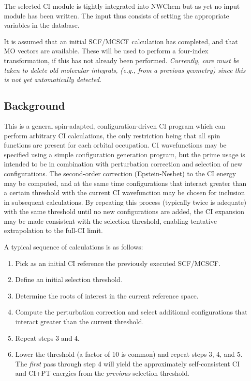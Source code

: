 \label{sec:selci}
The selected CI module is tightly integrated into NWChem but as yet no
input module has been written.  The input thus consists of setting the
appropriate variables in the database.

It is assumed that an initial SCF/MCSCF calculation has completed, and
that MO vectors are available.  These will be used to perform a
four-index transformation, if this has not already been performed.
{\em Currently, care must be taken to delete old molecular integrals,
  (e.g., from a previous geometry) since this is not yet automatically
  detected.}

\subsection{Background}

This is a general spin-adapted, configuration-driven CI program
which can perform arbitrary CI calculations, the only restriction
being that all spin functions are present for each orbital occupation.
CI wavefunctions may be specified using a simple configuration
generation program, but the prime usage is intended to be in
combination with perturbation correction and selection of new
configurations.  The second-order correction (Epstein-Nesbet) to the
CI energy may be computed, and at the same time configurations that
interact greater than a certain threshold with the current CI
wavefunction may be chosen for inclusion in subsequent calculations.
By repeating this process (typically twice is adequate) with the same
threshold until no new configurations are added, the CI expansion may
be made consistent with the selection threshold, enabling tentative 
extrapolation to the full-CI limit.

A typical sequence of calculations is as follows:
\begin{enumerate}
\item Pick as an initial CI reference the previously executed
  SCF/MCSCF.
\item Define an initial selection threshold.
\item Determine the roots of interest in the current reference space.
\item Compute the perturbation correction and select additional
  configurations that interact greater than the current threshold.
\item Repeat steps 3 and 4.
\item Lower the threshold (a factor of 10 is common) and repeat steps
  3, 4, and 5.  The {\em first} pass through step 4 will yield the
  approximately self-consistent CI and CI+PT energies from the {\em
    previous} selection threshold.
\end{enumerate}

